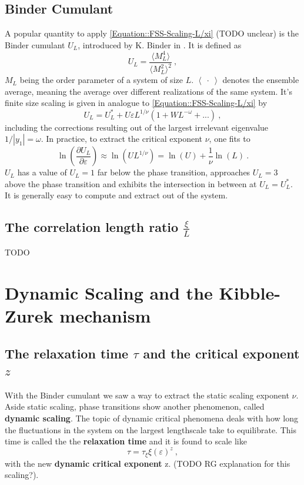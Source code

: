  	\subsection{Binder Cumulant} \label{Sec::Binder-Cumulant}
 	A popular quantity to apply \autoref{Equation::FSS-Scaling-L/xi} (TODO	unclear) is the Binder cumulant $U_L$, introduced by K. Binder in \cite{binder1981finite}. It is defined as
 	\begin{equation} \label{Eq::Def-Binder-Cum}
 		U_L =	\frac{\langle M_L^4 \rangle}{\langle M_L^2 \rangle^2}~,
 	\end{equation}
 	$M_L$ being the order parameter of a system of size $L$. $\left\langle~\cdot~\right \rangle$ denotes the ensemble average, meaning the average over different realizations of the same system. It's finite size scaling is given in analogue to \autoref{Equation::FSS-Scaling-L/xi} by
 	\begin{equation}
 		U_L =	U_L^* + U \varepsilon L^{1/\nu} \left(1 + W L^{-\omega} + ...\right)~,
 	\end{equation}
 	including the corrections resulting out of the largest irrelevant eigenvalue $1/|y_1| =	\omega $.
 	In practice, to extract the critical exponent $\nu$, one fits to
 	\begin{equation} \label{Eq::FSS-dU_dT}
 		\ln \left(\frac{\partial U_L}{\partial \varepsilon}\right) \approx	\ln \left(U L^{1/\nu} \right) =	\ln (U) + \frac{1}{\nu} \ln (L) ~.
 	\end{equation}
  	$U_L$ has a value of $U_L = 1$ far below the phase transition, approaches $U_L =	3$ above the phase transition and exhibits the intersection in between at $U_L =	U_L^*$. It is generally easy to compute and extract out of the system.
  	
  	\subsection{The correlation length ratio $\frac{\xi}{L}$}
  	TODO
  	
	\section{Dynamic Scaling and the Kibble-Zurek mechanism} \label{Section::Dynamic-Scaling}
	\subsection{The relaxation time $\tau$ and the critical exponent $z$}
	With the Binder cumulant we saw a way to extract the static scaling exponent $\nu$. Aside static scaling, phase transitions show another phenomenon, called \textbf{dynamic scaling}. The topic of dynamic critical phenomena deals with how long the fluctuations in the system on the largest lengthscale take to equilibrate. This time is called the the \textbf{relaxation time} and it is found to scale like
	\begin{equation}
		\tau =	\tau_\xi \xi(\varepsilon)^z~,
	\end{equation}
	with the new \textbf{dynamic critical exponent} z. (TODO RG explanation for this scaling?). \\
	
